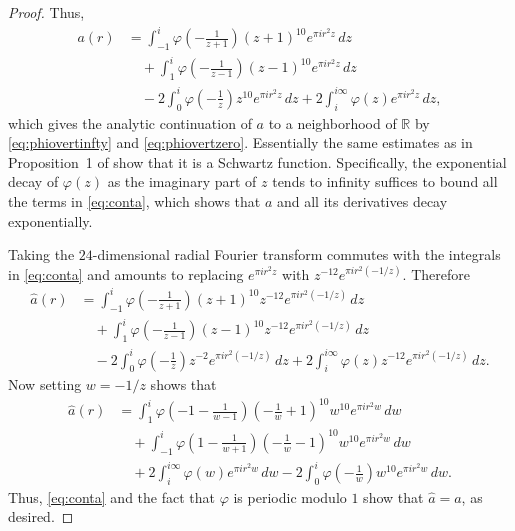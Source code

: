 \documentclass{aomart}
\theoremstyle{plain}
\numberwithin{theorem}{section}
\numberwithin{equation}{section}
\newcommand{\R}{{\mathbb R}}
\begin{document}
\begin{proof}
Thus,
\begin{equation}
\label{eq:conta}
\begin{split}
a(r) & =
\int_{-1}^{i} \varphi\mathopen{}\left(-\frac{1}{z+1}\right)\mathclose{} (z+1)^{10} e^{\pi i r^2 z} \, dz\\
& \quad \phantom{} + \int_1^{i} \varphi\mathopen{}\left(-\frac{1}{z-1}\right)\mathclose{} (z-1)^{10} e^{\pi i r^2 z} \, dz\\
& \quad \phantom{} - 2 \int_0^{i} \varphi\mathopen{}\left(-\frac{1}{z}\right)\mathclose{} z^{10} e^{\pi i r^2 z} \, dz + 2 \int_i^{i \infty} \varphi(z) e^{\pi i r^2 z} \, dz,
\end{split}
\end{equation}
which gives the analytic continuation of $a$ to a neighborhood of $\R$ by
\eqref{eq:phiovertinfty} and \eqref{eq:phiovertzero}. Essentially the same
estimates as in Proposition~1 of \cite{V} show that it is a Schwartz
function.  Specifically, the exponential decay of $\varphi(z)$ as the
imaginary part of $z$ tends to infinity suffices to bound all the terms in
\eqref{eq:conta}, which shows that $a$ and all its derivatives decay
exponentially.

Taking the $24$-dimensional radial Fourier transform commutes with the
integrals in \eqref{eq:conta} and amounts to replacing $e^{\pi i r^2 z}$ with
$z^{-12} e^{\pi i r^2 (-1/z)}$.  Therefore
\begin{align*}
\widehat{a}(r) & =
\int_{-1}^{i} \varphi\mathopen{}\left(-\frac{1}{z+1}\right)\mathclose{} (z+1)^{10} z^{-12} e^{\pi i r^2 (-1/z)} \, dz\\
& \quad \phantom{} + \int_1^{i} \varphi\mathopen{}\left(-\frac{1}{z-1}\right)\mathclose{} (z-1)^{10} z^{-12} e^{\pi i r^2 (-1/z)} \, dz\\
& \quad \phantom{} - 2 \int_0^{i} \varphi\mathopen{}\left(-\frac{1}{z}\right)\mathclose{} z^{-2} e^{\pi i r^2 (-1/z)} \, dz + 2 \int_i^{i \infty} \varphi(z) z^{-12} e^{\pi i r^2 (-1/z)} \, dz.
\end{align*}
Now setting $w = -1/z$ shows that
\begin{align*}
\widehat{a}(r) & =
\int_{1}^{i} \varphi\mathopen{}\left(-1-\frac{1}{w-1}\right)\mathclose{} \left(-\frac{1}{w}+1\right)^{10} w^{10} e^{\pi i r^2 w} \, dw\\
& \quad \phantom{} + \int_{-1}^{i} \varphi\mathopen{}\left(1-\frac{1}{w+1}\right)\mathclose{} \left(-\frac{1}{w}-1\right)^{10} w^{10} e^{\pi i r^2 w} \, dw\\
& \quad \phantom{} + 2 \int_i^{i\infty} \varphi(w) e^{\pi i r^2 w} \, dw - 2 \int_0^{i} \varphi\mathopen{}\left(-\frac{1}{w}\right)\mathclose{} w^{10} e^{\pi i r^2 w} \, dw.
\end{align*}
Thus, \eqref{eq:conta} and the fact that $\varphi$ is periodic modulo $1$
show that $\widehat{a} = a$, as desired.
\end{proof}
\end{document}
